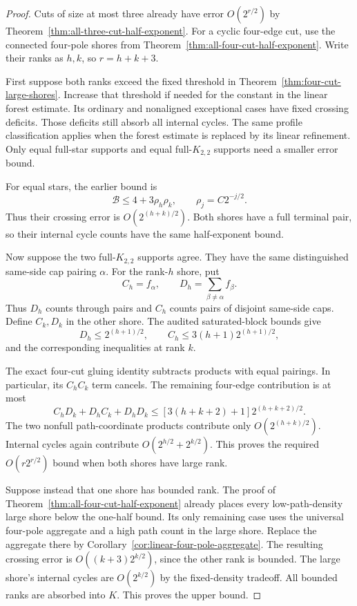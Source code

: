 \begin{proof}
Cuts of size at most three already have error $O(2^{r/2})$ by Theorem~\ref{thm:all-three-cut-half-exponent}.
For a cyclic four-edge cut, use the connected four-pole shores from Theorem~\ref{thm:all-four-cut-half-exponent}.
Write their ranks as $h,k$, so $r=h+k+3$.

First suppose both ranks exceed the fixed threshold in Theorem~\ref{thm:four-cut-large-shores}.
Increase that threshold if needed for the constant in the linear forest estimate.
Its ordinary and nonaligned exceptional cases have fixed crossing deficits.
Those deficits still absorb all internal cycles.
The same profile classification applies when the forest estimate is replaced by its linear refinement.
Only equal full-star supports and equal full-$K_{2,2}$ supports need a smaller error bound.

For equal stars, the earlier bound is
\[
 \mathcal B\le4+3\rho_h\rho_k,
 \qquad \rho_j=C2^{-j/2}.
\]
Thus their crossing error is $O(2^{(h+k)/2})$.
Both shores have a full terminal pair, so their internal cycle counts have the same half-exponent bound.

Now suppose the two full-$K_{2,2}$ supports agree.
They have the same distinguished same-side cap pairing $\alpha$.
For the rank-$h$ shore, put
\[
 C_h=f_\alpha,\qquad D_h=\sum_{\beta\ne\alpha}f_\beta.
\]
Thus $D_h$ counts through pairs and $C_h$ counts pairs of disjoint same-side caps.
Define $C_k,D_k$ in the other shore.
The audited saturated-block bounds give
\[
 D_h\le2^{(h+1)/2},\qquad
 C_h\le3(h+1)2^{(h+1)/2},
\]
and the corresponding inequalities at rank $k$.

The exact four-cut gluing identity subtracts products with equal pairings.
In particular, its $C_hC_k$ term cancels.
The remaining four-edge contribution is at most
\[
 C_hD_k+D_hC_k+D_hD_k
 \le[3(h+k+2)+1]2^{(h+k+2)/2}.
\]
The two nonfull path-coordinate products contribute only $O(2^{(h+k)/2})$.
Internal cycles again contribute $O(2^{h/2}+2^{k/2})$.
This proves the required $O(r2^{r/2})$ bound when both shores have large rank.

Suppose instead that one shore has bounded rank.
The proof of Theorem~\ref{thm:all-four-cut-half-exponent} already places every low-path-density large shore below the one-half bound.
Its only remaining case uses the universal four-pole aggregate and a high path count in the large shore.
Replace the aggregate there by Corollary~\ref{cor:linear-four-pole-aggregate}.
The resulting crossing error is $O((k+3)2^{k/2})$, since the other rank is bounded.
The large shore's internal cycles are $O(2^{k/2})$ by the fixed-density tradeoff.
All bounded ranks are absorbed into $K$.
This proves the upper bound.


\end{proof}
